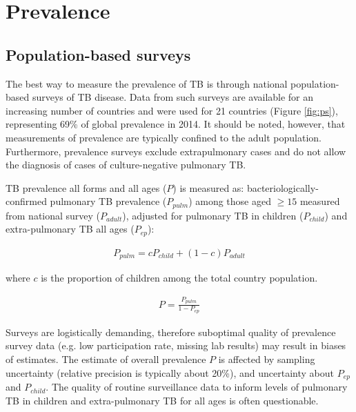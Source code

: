 \section{Prevalence}

\subsection{Population-based surveys}
The best way to measure the prevalence of TB is through national population-based surveys of TB disease\cite{18713496}\cite{WHO2011}. Data from such surveys are available for an increasing number of countries and were used for 21 countries (Figure \ref{fig:ps}), representing 69\% of global prevalence in 2014. It should be noted, however, that measurements of prevalence are typically confined to the adult population. Furthermore, prevalence surveys exclude extrapulmonary cases and do not allow the diagnosis of cases of culture-negative pulmonary TB. 

TB prevalence all forms and all ages ($P$) is measured as:  bacteriologically-confirmed pulmonary TB prevalence ($P_{pulm}$) among those aged $\geq 15$ measured from national survey ($P_{adult}$), adjusted for pulmonary TB in children ($P_{child}$) and extra-pulmonary TB all ages ($P_{ep}$):

\begin{align*}
P_{pulm} = c P_{child} + (1 − c) P_{adult}
\end{align*}

where $c$ is the proportion of children among the total country population.

\begin{align*}
P = \frac{P_{pulm}}{1 - P_{ep}}
\end{align*}

Surveys are logistically demanding, therefore suboptimal quality of prevalence survey data (e.g. low participation rate, missing lab results) may result in biases of estimates. The estimate of overall prevalence $P$ is affected by sampling uncertainty (relative precision is typically about 20\%), and uncertainty about $P_{ep}$ and $P_{child}$. The  quality of routine surveillance data to inform levels of pulmonary TB in children and extra-pulmonary TB for all ages is often questionable.



 